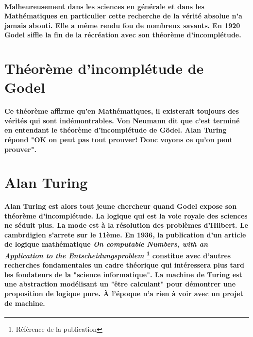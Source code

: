 \documentclass[a4paper, 11pt]{book}
\begin{document}
\paragraph{
  Malheureusement dans les sciences en générale et dans les Mathématiques en particulier cette recherche de la vérité absolue n'a jamais abouti. Elle a même rendu fou de nombreux savants. En 1920 Godel siffle la fin de la récréation avec son théorème d'incomplétude.
}

\section*{Théorème d'incomplétude de Godel}

\paragraph{
  Ce théorème affirme qu'en Mathématiques, il existerait toujours des vérités qui sont indémontrables. Von Neumann dit que c'est terminé en entendant le théorème d'incomplétude de Gödel. Alan Turing répond "OK on peut pas tout prouver! Donc voyons ce qu'on peut prouver".
}

\section*{Alan Turing}

\paragraph{Alan Turing est alors tout jeune chercheur quand Godel expose son théorème d'incomplétude. La logique qui est la voie royale des sciences ne séduit plus. La mode est à la résolution des problèmes d'Hilbert. Le cambrdigien s'arrete sur le 11ème. En 1936, la publication d'un article de logique mathématique \textit{On computable Numbers, with an Application to the Entscheidungsproblem} \footnote{Référence de la publication} constitue avec d'autres recherches fondamentales un cadre théorique qui intéressera plus tard les fondateurs de la "science informatique". La machine de Turing est une abstraction modélisant un "être calculant" pour démontrer une proposition de logique pure. À l'époque n'a rien à voir avec un projet de machine.}

\end{document}
